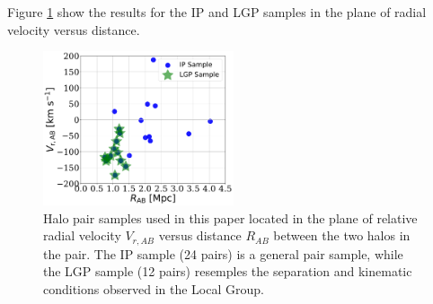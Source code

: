 \documentclass[useAMS,usenatbib,usegraphicx]{mn2e}
\begin{document}
Figure \ref{fig:samples} show the results for the IP and LGP samples
in the plane of radial velocity versus distance.

\begin{figure}
\centering
\includegraphics[width=0.5\textwidth]{v_r_pairs.pdf}
\caption{Halo pair samples used in this paper located in the
  plane of relative radial velocity $V_{r,AB}$ versus 
  distance $R_{AB}$ between the two halos in the pair.
  The IP sample (24 pairs) is a general pair sample, while the LGP
  sample (12 pairs) resemples the separation and kinematic
  conditions observed in the Local Group.} 
\label{fig:samples}
\end{figure}





\end{document}
